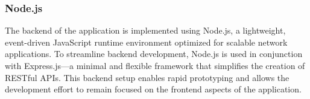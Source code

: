 \subsubsection*{Node.js}
The backend of the application is implemented using Node.js, a lightweight, event-driven JavaScript runtime environment optimized for scalable network applications. To streamline backend development, Node.js is used in conjunction with Express.js—a minimal and flexible framework that simplifies the creation of RESTful APIs. This backend setup enables rapid prototyping and allows the development effort to remain focused on the frontend aspects of the application.
